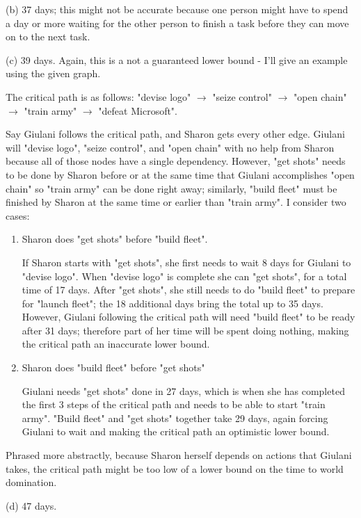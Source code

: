 \documentclass[11pt]{article}
\begin{document}
	\begin{description}
	
	\item{(b)}
		37 days; this might not be accurate because one person might have to 
		spend a day or more waiting for the other person to finish a task before 
		they can move on to the next task.
		
	\item{(c)}
		39 days. Again, this is a not a guaranteed lower bound - I'll give an example using the given graph.
		
		The critical path is as follows: "devise logo" $\rightarrow$ "seize 
		control" $\rightarrow$ "open chain" $\rightarrow$ "train army" 
		$\rightarrow$ "defeat Microsoft". 
		
		Say Giulani follows the critical path, and 
		Sharon gets every other edge. Giulani will "devise logo", "seize control", and "open chain" with no help from Sharon because all of those nodes have a single dependency. However, "get shots" needs to be done by Sharon before or at the same time that Giulani accomplishes "open chain" so "train army" can be done right away; similarly, "build fleet" must be finished by Sharon at the same time or earlier than "train army".  I consider two cases:
		\begin{enumerate}
		\item Sharon does "get shots" before "build fleet".
		
		If Sharon starts with "get shots", she first needs to wait 8 days for Giulani to "devise logo". When "devise logo" is complete she can "get shots", for a total time of 17 days. After "get shots", she still needs to do "build fleet" to prepare for "launch fleet"; the 18 additional days bring the total up to 35 days. However, Giulani following the critical path will need "build fleet" to be ready after 31 days; therefore part of her time will be spent doing nothing, making the critical path an inaccurate lower bound.
		
		\item Sharon does "build fleet" before "get shots"
		
		Giulani needs "get shots" done in 27 days, which is when she has completed the first 3 steps of the critical path and needs to be able to start "train army". "Build fleet" and "get shots" together take 29 days, again forcing Giulani to wait and making the critical path an optimistic lower bound.
		\end{enumerate}
		
	Phrased more abstractly, because Sharon herself depends on actions that Giulani takes, the critical path might be too low of a lower bound on the time to world domination.

	\item{(d)}
		47 days.		
	\end{description}
\end{document}
